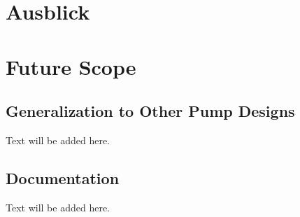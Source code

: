 {\chapter{Ausblick}}
{\chapter{Future Scope}}

\label{sec:conclusion}

\section{Generalization to Other Pump Designs}
Text will be added here.

\section{Documentation}
Text will be added here.
